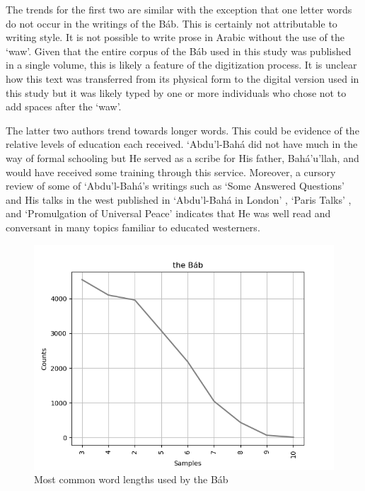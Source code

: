 \documentclass[12pt, oneside]{report}
\begin{document}
\par
The trends for the first two are similar with the exception that one letter words do not occur in the writings of the B\'{a}b.
This is certainly not attributable to writing style.
It is not possible to write prose in Arabic without the use of the `waw'.
Given that the entire corpus of the B\'{a}b used in this study was published in a single volume, this is likely a feature of the digitization process.
It is unclear how this text was transferred from its physical form to the digital version used in this study but it was likely typed by one or more individuals who chose not to add spaces after the `waw'.
\par
The latter two authors trend towards longer words.
This could be evidence of the relative levels of education each received.
`Abdu'l-Bah\'{a} did not have much in the way of formal schooling but He served as a scribe for His father, Bah\'{a}'u'llah, and would have received some training through this service.
Moreover, a cursory review of some of `Abdu'l-Bah\'{a}'s writings such as `Some Answered Questions' \cite{abdul-baha_answered_1990} and His talks in the west published in `Abdu'l-Bah\'{a} in London' \cite{abdul-baha_abdul-baha_1982}, `Paris Talks' \cite{abdul-baha_paris_nodate}, and `Promulgation of Universal Peace' \cite{abdul-baha_promulgation_1982} indicates that He was well read and conversant in many topics familiar to educated westerners.
\begin{figure}[htb]
	\centering
	\includegraphics[width=15cm]{figures/word-length-bab.png}
	\caption[Most common word lengths used by the B\'{a}b]{Most common word lengths used by the B\'{a}b}
	\label{fig:word-length-bab}
\end{figure}
\end{document}
